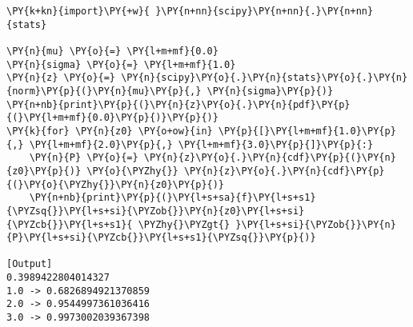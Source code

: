 \begin{Verbatim}[label=\makebox{\href{https://github.com/unipi-physics-labs/lab1-notes/tree/main/snippy/scipy.stats.norm.py}{https://github.com/.../scipy.stats.norm.py}},commandchars=\\\{\}]
\PY{k+kn}{import}\PY{+w}{ }\PY{n+nn}{scipy}\PY{n+nn}{.}\PY{n+nn}{stats}

\PY{n}{mu} \PY{o}{=} \PY{l+m+mf}{0.0}
\PY{n}{sigma} \PY{o}{=} \PY{l+m+mf}{1.0}
\PY{n}{z} \PY{o}{=} \PY{n}{scipy}\PY{o}{.}\PY{n}{stats}\PY{o}{.}\PY{n}{norm}\PY{p}{(}\PY{n}{mu}\PY{p}{,} \PY{n}{sigma}\PY{p}{)}
\PY{n+nb}{print}\PY{p}{(}\PY{n}{z}\PY{o}{.}\PY{n}{pdf}\PY{p}{(}\PY{l+m+mf}{0.0}\PY{p}{)}\PY{p}{)}
\PY{k}{for} \PY{n}{z0} \PY{o+ow}{in} \PY{p}{[}\PY{l+m+mf}{1.0}\PY{p}{,} \PY{l+m+mf}{2.0}\PY{p}{,} \PY{l+m+mf}{3.0}\PY{p}{]}\PY{p}{:}
    \PY{n}{P} \PY{o}{=} \PY{n}{z}\PY{o}{.}\PY{n}{cdf}\PY{p}{(}\PY{n}{z0}\PY{p}{)} \PY{o}{\PYZhy{}} \PY{n}{z}\PY{o}{.}\PY{n}{cdf}\PY{p}{(}\PY{o}{\PYZhy{}}\PY{n}{z0}\PY{p}{)}
    \PY{n+nb}{print}\PY{p}{(}\PY{l+s+sa}{f}\PY{l+s+s1}{\PYZsq{}}\PY{l+s+si}{\PYZob{}}\PY{n}{z0}\PY{l+s+si}{\PYZcb{}}\PY{l+s+s1}{ \PYZhy{}\PYZgt{} }\PY{l+s+si}{\PYZob{}}\PY{n}{P}\PY{l+s+si}{\PYZcb{}}\PY{l+s+s1}{\PYZsq{}}\PY{p}{)}

[Output]
0.3989422804014327
1.0 -> 0.6826894921370859
2.0 -> 0.9544997361036416
3.0 -> 0.9973002039367398
\end{Verbatim}
